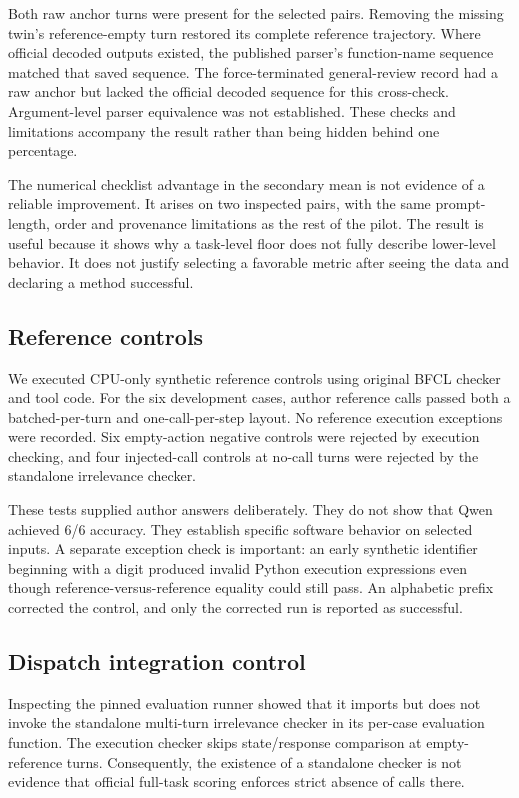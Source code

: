 \documentclass[conference]{IEEEtran}
\begin{document}
Both raw anchor turns were present for the selected pairs. Removing the missing twin's reference-empty turn restored its complete reference trajectory. Where official decoded outputs existed, the published parser's function-name sequence matched that saved sequence. The force-terminated general-review record had a raw anchor but lacked the official decoded sequence for this cross-check. Argument-level parser equivalence was not established. These checks and limitations accompany the result rather than being hidden behind one percentage.

The numerical checklist advantage in the secondary mean is not evidence of a reliable improvement. It arises on two inspected pairs, with the same prompt-length, order and provenance limitations as the rest of the pilot. The result is useful because it shows why a task-level floor does not fully describe lower-level behavior. It does not justify selecting a favorable metric after seeing the data and declaring a method successful.

\subsection{Reference controls}
We executed CPU-only synthetic reference controls using original BFCL checker and tool code. For the six development cases, author reference calls passed both a batched-per-turn and one-call-per-step layout. No reference execution exceptions were recorded. Six empty-action negative controls were rejected by execution checking, and four injected-call controls at no-call turns were rejected by the standalone irrelevance checker.

These tests supplied author answers deliberately. They do not show that Qwen achieved 6/6 accuracy. They establish specific software behavior on selected inputs. A separate exception check is important: an early synthetic identifier beginning with a digit produced invalid Python execution expressions even though reference-versus-reference equality could still pass. An alphabetic prefix corrected the control, and only the corrected run is reported as successful.

\subsection{Dispatch integration control}
Inspecting the pinned evaluation runner showed that it imports but does not invoke the standalone multi-turn irrelevance checker in its per-case evaluation function. The execution checker skips state/response comparison at empty-reference turns. Consequently, the existence of a standalone checker is not evidence that official full-task scoring enforces strict absence of calls there.
\end{document}
